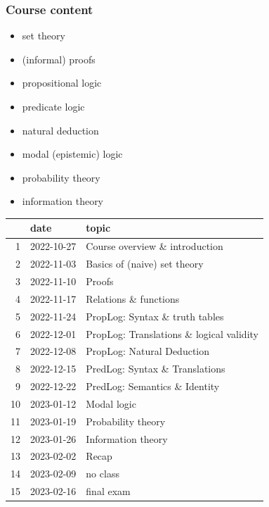 \documentclass[fleqn,10pt,serif,xcolor=svgnames,xcolor=table,aspectratio=169,handout]{beamer}
\begin{document}
\begin{frame}
  \frametitle{Course content}

  \begin{minipage}{0.32\linewidth}

    \begin{itemize}
      \item set theory
      \item (informal) proofs
      \item propositional logic
      \item predicate logic
      \item natural deduction
      \item modal (epistemic) logic
      \item probability theory
      \item information theory
    \end{itemize}
  \end{minipage}
  \hfill
  \begin{minipage}{0.67\linewidth}
    \begin{tabular}{rll}
         & date & topic\\ \midrule
      1  & 2022-10-27 & Course overview \& introduction\\
      2  & 2022-11-03 & Basics of (naive) set theory\\
      3  & 2022-11-10 & Proofs\\
      4  & 2022-11-17 & Relations \& functions\\
      5  & 2022-11-24 & PropLog: Syntax \& truth tables\\
      6  & 2022-12-01 & PropLog: Translations \& logical validity\\
      7  & 2022-12-08 & PropLog: Natural Deduction\\
      8  & 2022-12-15 & PredLog: Syntax \& Translations\\
      9  & 2022-12-22 & PredLog: Semantics \& Identity\\ \midrule
      10 & 2023-01-12 & Modal logic\\
      11 & 2023-01-19 & Probability theory\\
      12 & 2023-01-26 & Information theory\\
      13 & 2023-02-02 & Recap\\
      14 & 2023-02-09 & no class\\
      15 & 2023-02-16 & final exam\\
    \end{tabular}
  \end{minipage}
\end{frame}
\end{document}
